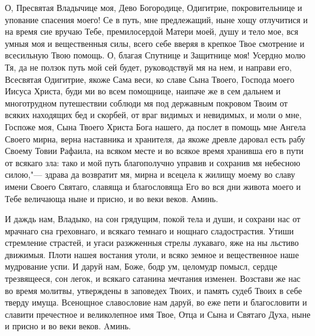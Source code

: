 \mychapterending


\begin{mymulticols}



О, Пресвятая Владычице моя, Дево Богородице, Одигитрие, покровительнице и упование спасения моего! Се в путь, мне предлежащий, ныне хощу отлучитися и на время сие вручаю Тебе, премилосердой Матери моей, душу и тело мое, вся умныя моя и вещественныя силы, всего себе вверяя в крепкое Твое смотрение и всесильную Твою помощь. О, благая Спутнице и Защитнице моя! Усердно молю Тя, да не ползок путь мой сей будет, руководствуй мя на нем, и направи его, Всесвятая Одигитрие, якоже Сама веси, ко славе Сына Твоего, Господа моего Иисуса Христа, буди ми во всем помощнице, наипаче же в сем дальнем и многотрудном путешествии соблюди мя под державным покровом Твоим от всяких находящих бед и скорбей, от враг видимых и невидимых, и моли о мне, Госпоже моя, Сына Твоего Христа Бога нашего, да послет в помощь мне Ангела Своего мирна, верна наставника и хранителя, да якоже древле даровал есть рабу Своему Товии Рафаила, на всяком месте и во всякое время хранивша его в пути от всякаго зла: тако и мой путь благополучно управив и сохранив мя небесною силою,"--- здрава да возвратит мя, мирна и всецела к жилищу моему во славу имени Своего Святаго, славяща и благословяща Его во вся дни живота моего и Тебе величающа ныне и присно, и во веки веков. Аминь.

\end{mymulticols}

\mychapterending


\begin{mymulticols}



И даждь нам, Владыко, на сон грядущим, покой тела и души, и сохрани нас от мрачнаго сна греховнаго, и всякаго темнаго и нощнаго сладострастия. Утиши стремление страстей, и угаси разжженныя стрелы лукаваго, яже на ны льстиво движимыя. Плоти нашея востания утоли, и всяко земное и вещественное наше мудрование успи. И даруй нам, Боже, бодр ум, целомудр помысл, сердце трезвящееся, сон легок, и всякаго сатанина мечтания изменен. Возстави же нас во время молитвы, утверждены в заповедех Твоих, и память судеб Твоих в себе тверду имуща. Всенощное славословие нам даруй, во еже пети и благословити и славити пречестное и великолепное имя Твое, Отца и Сына и Святаго Духа, ныне и присно и во веки веков. Aминь.




\end{mymulticols}


